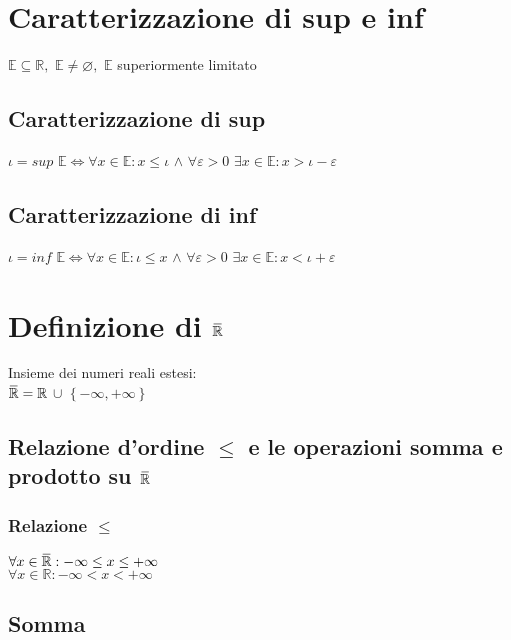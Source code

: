 \documentclass[a4paper, twoside, italian, 11pt]{book}
\newcommand{\braces}[1] {\left\{#1\right\}}
\newcommand{\overbar}[1]{\mkern 1.5mu\overline{\mkern-1.5mu#1\mkern-1.5mu}\mkern 1.5mu}
\newcommand{\R}{\mathbb{R}}
\newcommand{\E}{\mathbb{E}}
\let\emptyset\varnothing
\begin{document}
\section{Caratterizzazione di sup e inf}

\noindent
$\E \subseteq \R,$ $\E \neq \emptyset,$ $\E$ superiormente limitato


\subsection{Caratterizzazione di sup}

\noindent
$\iota = sup$ $\E \iff \forall x \in \E : x \leq \iota$ $\land$ $\forall \varepsilon > 0$ $\exists x \in \E : x > \iota - \varepsilon$


\subsection{Caratterizzazione di inf}

\noindent
$\iota = inf$ $\E \iff \forall x \in \E : \iota \leq x$ $\land$ $\forall \varepsilon > 0$ $\exists x \in \E : x < \iota + \varepsilon$



\section{Definizione di $\overbar \R$}

\noindent
Insieme dei numeri reali estesi: \\
$\overbar \R = \R$ $\cup$ $\braces{-\infty, +\infty}$


\subsection {Relazione d'ordine $\leq$ e le operazioni somma e prodotto su $\overbar \R$}


\subsubsection{Relazione $\leq$}

\noindent
$\forall x \in \overbar \R: -\infty \leq x \leq +\infty$ \\
$\forall x \in \R: -\infty < x < +\infty$


\subsection{Somma}
\end{document}
